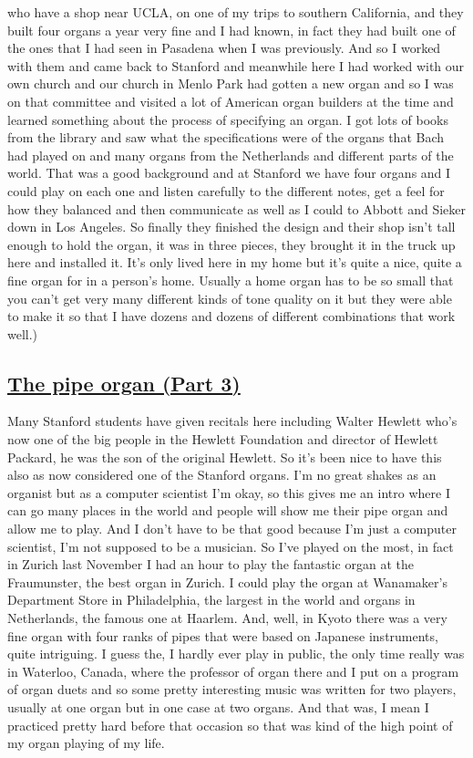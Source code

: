 \documentclass[]{article}
\begin{document}
who have a shop near UCLA, on one of my trips to southern California,
and they built four organs a year very fine and I had known, in fact
they had built one of the ones that I had seen in Pasadena when I was
previously. And so I worked with them and came back to Stanford and
meanwhile here I had worked with our own church and our church in Menlo
Park had gotten a new organ and so I was on that committee and visited a
lot of American organ builders at the time and learned something about
the process of specifying an organ. I got lots of books from the library
and saw what the specifications were of the organs that Bach had played
on and many organs from the Netherlands and different parts of the
world. That was a good background and at Stanford we have four organs
and I could play on each one and listen carefully to the different
notes, get a feel for how they balanced and then communicate as well as
I could to Abbott and Sieker down in Los Angeles. So finally they
finished the design and their shop isn't tall enough to hold the organ,
it was in three pieces, they brought it in the truck up here and
installed it. It's only lived here in my home but it's quite a nice,
quite a fine organ for in a person's home. Usually a home organ has to
be so small that you can't get very many different kinds of tone quality
on it but they were able to make it so that I have dozens and dozens of
different combinations that work well.)

\subsection{\texorpdfstring{\href{http://webofstories.com/play/17149}{The
pipe organ (Part
3)}}{The pipe organ (Part 3)}}\label{the-pipe-organ-part-3}

Many Stanford students have given recitals here including Walter Hewlett
who's now one of the big people in the Hewlett Foundation and director
of Hewlett Packard, he was the son of the original Hewlett. So it's been
nice to have this also as now considered one of the Stanford organs. I'm
no great shakes as an organist but as a computer scientist I'm okay, so
this gives me an intro where I can go many places in the world and
people will show me their pipe organ and allow me to play. And I don't
have to be that good because I'm just a computer scientist, I'm not
supposed to be a musician. So I've played on the most, in fact in Zurich
last November I had an hour to play the fantastic organ at the
Fraumunster, the best organ in Zurich. I could play the organ at
Wanamaker's Department Store in Philadelphia, the largest in the world
and organs in Netherlands, the famous one at Haarlem. And, well, in
Kyoto there was a very fine organ with four ranks of pipes that were
based on Japanese instruments, quite intriguing. I guess the, I hardly
ever play in public, the only time really was in Waterloo, Canada, where
the professor of organ there and I put on a program of organ duets and
so some pretty interesting music was written for two players, usually at
one organ but in one case at two organs. And that was, I mean I
practiced pretty hard before that occasion so that was kind of the high
point of my organ playing of my life.
\end{document}
